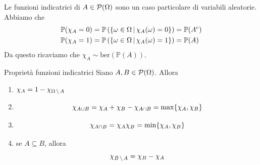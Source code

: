\documentclass[a4paper]{article}
\begin{document}
Le funzioni indicatrici di \(A \in \mathcal P(\Omega)\)
sono un caso particolare di variabili aleatorie.
Abbiamo che
\begin{align*}
    \mathbb P(\chi_A = 0) &=
    \mathbb P\left(
        \{
            \omega\in\Omega \,|\, \chi_A(\omega) = 0
        \}
    \right)
    = \mathbb P(A^c) \\
    \mathbb P(\chi_A = 1) &=
    \mathbb P\left(
        \{
            \omega\in\Omega \,|\, \chi_A(\omega) = 1
        \}
    \right)
    = \mathbb P(A)
\end{align*}
Da questo ricaviamo che \(\chi_A \sim \text{ber}(\mathbb P(A))\).

\begin{snippetproposition}{Proprietà funzioni indicatrici}
    Siano \(A,B \in \mathcal P(\Omega)\). Allora
    \begin{enumerate}
        \item \(\chi_A = 1- \chi_{\Omega \,\backslash\, A}\)
        \item \[
                \chi_{A\cup B} = \chi_A + \chi_B - \chi_{A \cap B}
                = \max\{\chi_A, \chi_B\}
            \]
        \item \[
                \chi_{A \cap B} = \chi_A \chi_B = \min\{\chi_A, \chi_B\}
            \]
        \item se \(A \subseteq B\), allora
            \[
                \chi_{B \,\backslash\, A} = \chi_B - \chi_A
            \]
    \end{enumerate}
\end{snippetproposition}
\end{document}
